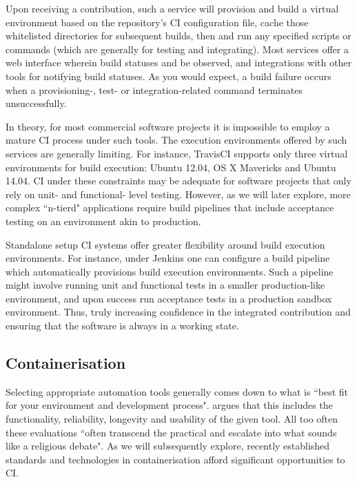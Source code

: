 \documentclass{report}
\begin{document}
\par
Upon receiving a contribution, such a service will provision
and build a virtual environment based on the repository's CI configuration
file, cache those whitelisted directories for subsequent builds, then and run any
specified scripts or commands (which are generally for testing and integrating).
Most services offer a web interface wherein build statuses and be observed, and 
integrations with other tools for notifying build statuses. As you would expect,
a build failure occurs when a provisioning-, test- or integration-related command
terminates unsuccessfully. 
\par
In theory, for most commercial software projects it is impossible to
employ a mature CI process under such tools. The execution environments offered by such services are generally limiting. 
For instance, TravisCI supports  only three virtual environments for build execution: Ubuntu 12.04,
OS X Mavericks and Ubuntu 14.04. CI under these constraints may be
adequate for software projects that only rely on unit- and functional- level
testing. However, as we will later explore, more complex ``n-tierd" applications require build pipelines that 
include acceptance testing on an environment akin to production. 
\par
Standalone setup CI systems offer greater flexibility around build 
execution environments. For instance, under Jenkins one 
can configure a build pipeline which automatically provisions
build execution environments. Such a pipeline might involve
running unit and functional tests in a smaller production-like environment, and
upon success run acceptance tests in a production sandbox environment. Thus,
truly increasing confidence in the integrated contribution and ensuring that
the software is always in a working state. 

\subsection{Containerisation}
Selecting appropriate automation tools
generally comes down to what is ``best fit for your
environment and development process". \citet{Duvall}
argues that this includes the functionality, reliability, longevity and 
usability of the given tool. All too often these
evaluations ``often transcend the practical and 
escalate into what sounds like a religious debate". 
As we will subsequently explore, recently established 
standards and technologies in containerisation 
afford significant opportunities to CI.
\end{document}
